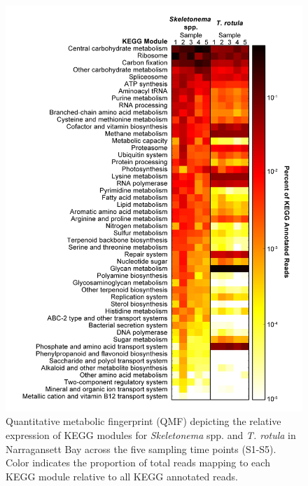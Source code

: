 \begin{figure}[p!]
  \centerline{ \includegraphics[width=1\textwidth]{Images/C3_Figure2_Heatmap_Hot.png}}
    \caption[Quantitative metabolic fingerprint across Narragansett Bay \textit{in situ} samples]{Quantitative metabolic fingerprint (QMF) depicting the relative expression of KEGG modules for \textit{Skeletonema} spp. and \textit{T. rotula} in Narragansett Bay across the five sampling time points (S1-S5). Color indicates the proportion of total reads mapping to each KEGG module relative to all KEGG annotated reads.}
  \label{fig:c3f2}
\end{figure}

